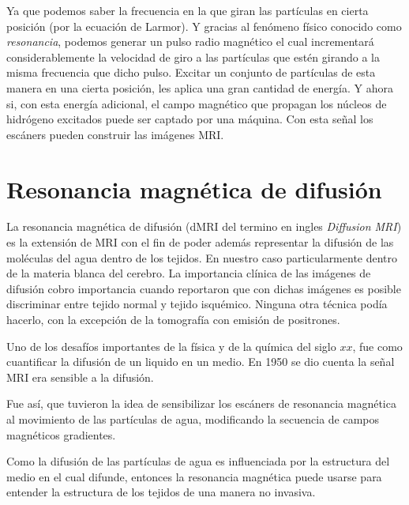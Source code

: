 \documentclass[11pt,a4paper,twoside]{tesis}
\begin{document}
Ya que podemos saber la frecuencia en la que giran las part\'iculas en cierta posici\'on (por la
ecuación de Larmor). Y gracias al fen\'omeno f\'isico conocido como 
\textit{resonancia}, podemos generar un pulso radio magnético el cual 
incrementar\'a considerablemente la velocidad de giro a las part\'iculas que 
est\'en girando a la misma frecuencia que dicho pulso. Excitar un conjunto 
de part\'iculas de esta manera en una cierta posici\'on, les aplica una 
gran cantidad de energ\'ia. Y ahora si, con esta energía adicional, el campo 
magn\'etico que propagan los n\'ucleos de hidr\'ogeno excitados puede ser 
captado por una m\'aquina. Con esta se\~nal los escáners pueden construir las 
im\'agenes MRI.


\section{Resonancia magnética de difusi\'on}


La resonancia magnética de difusi\'on (dMRI del termino en ingles 
\textit{Diffusion MRI}) es la extensi\'on de MRI con el fin de poder adem\'as  
representar la 
difusi\'on de las mol\'eculas del agua dentro de los tejidos. En nuestro caso particularmente 
dentro 
de la materia blanca del cerebro. La importancia cl\'inica de las im\'agenes de difusi\'on cobro 
importancia cuando \citet{Moseley1990} reportaron que con dichas im\'agenes es 
posible discriminar entre tejido normal y tejido isqu\'emico. Ninguna 
otra t\'ecnica pod\'ia hacerlo, con la excepci\'on de la tomograf\'ia con 
emisi\'on de positrones. 

Uno de los desafíos importantes de la física y de la química del siglo $xx$, 
fue como cuantificar la difusión de un liquido en un medio. En 1950 
\citet{Hahn1950} se dio cuenta la señal MRI era sensible a la difusión.

Fue as\'i, que \citet{CarrH.Y.andPurcell1954} tuvieron la idea de sensibilizar 
los escáners de resonancia magnética al movimiento de las part\'iculas de agua, 
modificando la secuencia de campos magn\'eticos gradientes.

Como la difusi\'on de las part\'iculas de agua es influenciada por la estructura del medio en el 
cual difunde, entonces la resonancia magnética puede usarse para entender la 
estructura de los tejidos de una manera no invasiva.  
\end{document}
